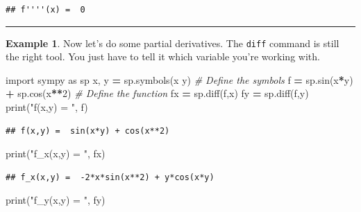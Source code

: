 \documentclass[
]{book}
\newenvironment{Shaded}{\begin{snugshade}}{\end{snugshade}}
\newcommand{\BuiltInTok}[1]{#1}
\newcommand{\CommentTok}[1]{\textcolor[rgb]{0.56,0.35,0.01}{\textit{#1}}}
\newcommand{\DecValTok}[1]{\textcolor[rgb]{0.00,0.00,0.81}{#1}}
\newcommand{\ImportTok}[1]{#1}
\newcommand{\NormalTok}[1]{#1}
\newcommand{\OperatorTok}[1]{\textcolor[rgb]{0.81,0.36,0.00}{\textbf{#1}}}
\newcommand{\StringTok}[1]{\textcolor[rgb]{0.31,0.60,0.02}{#1}}
\theoremstyle{definition}
\theoremstyle{definition}
\newtheorem{example}{Example}[chapter]
\theoremstyle{definition}
\theoremstyle{remark}
\begin{document}
\begin{verbatim}
## f''''(x) =  0
\end{verbatim}

\begin{center}\rule{0.5\linewidth}{0.5pt}\end{center}

\begin{example}
\protect\hypertarget{exm:unnamed-chunk-798}{}{\label{exm:unnamed-chunk-798} }Now let's do some partial derivatives. The \texttt{diff} command is still the right tool. You just have to tell it which variable you're working with.
\end{example}

\begin{Shaded}
\begin{Highlighting}[]
\ImportTok{import}\NormalTok{ sympy }\ImportTok{as}\NormalTok{ sp}
\NormalTok{x, y }\OperatorTok{=}\NormalTok{ sp.symbols(}\StringTok{\textquotesingle{}x y\textquotesingle{}}\NormalTok{) }\CommentTok{\# Define the symbols}
\NormalTok{f }\OperatorTok{=}\NormalTok{ sp.sin(x}\OperatorTok{*}\NormalTok{y) }\OperatorTok{+}\NormalTok{ sp.cos(x}\OperatorTok{**}\DecValTok{2}\NormalTok{) }\CommentTok{\# Define the function}
\NormalTok{fx }\OperatorTok{=}\NormalTok{ sp.diff(f,x)}
\NormalTok{fy }\OperatorTok{=}\NormalTok{ sp.diff(f,y)}
\BuiltInTok{print}\NormalTok{(}\StringTok{"f(x,y) = "}\NormalTok{, f)}
\end{Highlighting}
\end{Shaded}

\begin{verbatim}
## f(x,y) =  sin(x*y) + cos(x**2)
\end{verbatim}

\begin{Shaded}
\begin{Highlighting}[]
\BuiltInTok{print}\NormalTok{(}\StringTok{"f\_x(x,y) = "}\NormalTok{, fx)}
\end{Highlighting}
\end{Shaded}

\begin{verbatim}
## f_x(x,y) =  -2*x*sin(x**2) + y*cos(x*y)
\end{verbatim}

\begin{Shaded}
\begin{Highlighting}[]
\BuiltInTok{print}\NormalTok{(}\StringTok{"f\_y(x,y) = "}\NormalTok{, fy)}
\end{Highlighting}
\end{Shaded}
\end{document}
